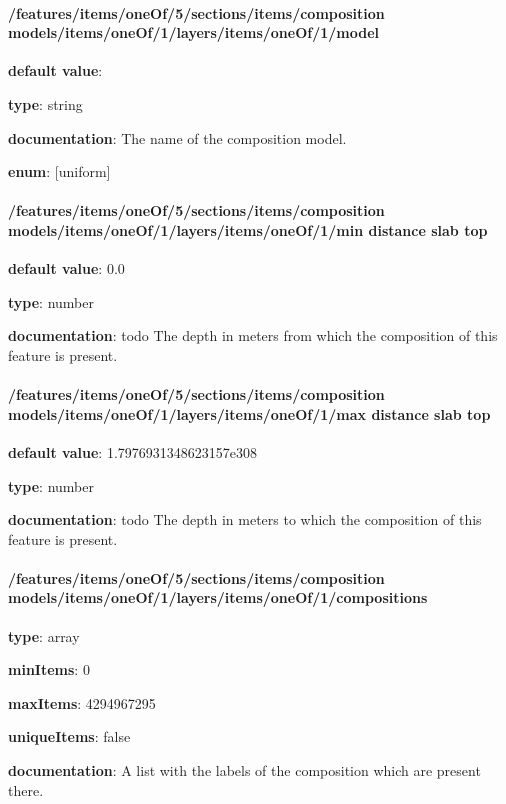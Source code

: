 \paragraph{/features/items/oneOf/5/sections/items/composition models/items/oneOf/1/layers/items/oneOf/1/model} \begin{itemized}
\item {\bf default value}: 
\item {\bf type}: string
\item {\bf documentation}: The name of the composition model.
\item {\bf enum}: [uniform]\end{itemized}\paragraph{/features/items/oneOf/5/sections/items/composition models/items/oneOf/1/layers/items/oneOf/1/min distance slab top} \begin{itemized}
\item {\bf default value}: 0.0
\item {\bf type}: number
\item {\bf documentation}: todo The depth in meters from which the composition of this feature is present.
\end{itemized}\paragraph{/features/items/oneOf/5/sections/items/composition models/items/oneOf/1/layers/items/oneOf/1/max distance slab top} \begin{itemized}
\item {\bf default value}: 1.7976931348623157e308
\item {\bf type}: number
\item {\bf documentation}: todo The depth in meters to which the composition of this feature is present.
\end{itemized}\paragraph{/features/items/oneOf/5/sections/items/composition models/items/oneOf/1/layers/items/oneOf/1/compositions} \begin{itemized}
\item {\bf type}: array
\item {\bf minItems}: 0
\item {\bf maxItems}: 4294967295
\item {\bf uniqueItems}: false
\item {\bf documentation}: A list with the labels of the composition which are present there.

\end{itemized}
